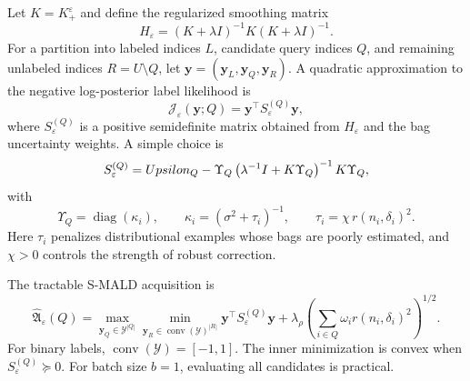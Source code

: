\documentclass[11pt,a4paper]{article}
\DeclareMathOperator{\diag}{diag}
\DeclareMathOperator{\conv}{conv}
\newcommand{\cY}{\mathcal{Y}}
\begin{document}
Let $K=K^\varepsilon_+$ and define the regularized smoothing matrix
\begin{equation}
H_\varepsilon=(K+\lambda I)^{-1}K(K+\lambda I)^{-1}.
\label{eq:H-eps}
\end{equation}
For a partition into labeled indices $L$, candidate query indices $Q$, and remaining unlabeled indices $R=U\setminus Q$, let $\bm y=(\bm y_L,\bm y_Q,\bm y_R)$. A quadratic approximation to the negative log-posterior label likelihood is
\begin{equation}
\mathcal{J}_\varepsilon(\bm y;Q)=\bm y^\top S_\varepsilon^{(Q)}\bm y,
\label{eq:quad-label-objective}
\end{equation}
where $S_\varepsilon^{(Q)}$ is a positive semidefinite matrix obtained from $H_\varepsilon$ and the bag uncertainty weights. A simple choice is
\begin{equation}
S_\varepsilon^{(Q)}=\\Upsilon_Q-
\Upsilon_Q\left(\lambda^{-1}I+K\Upsilon_Q\right)^{-1}K\Upsilon_Q,
\label{eq:S-eps}
\end{equation}
with
\begin{equation}
\Upsilon_Q=\diag(\kappa_i),
\qquad
\kappa_i=\left(\sigma^2+\tau_i\right)^{-1},
\qquad
\tau_i=\chi\,r(n_i,\delta_i)^2.
\label{eq:uncertainty-weight}
\end{equation}
Here $\tau_i$ penalizes distributional examples whose bags are poorly estimated, and $\chi>0$ controls the strength of robust correction.

The tractable S-MALD acquisition is
\begin{equation}
\widehat{\mathfrak{A}}_\varepsilon(Q)
=\max_{\bm y_Q\in\cY^{|Q|}}
\min_{\bm y_R\in\conv(\cY)^{|R|}}
\bm y^\top S_\varepsilon^{(Q)}\bm y
+\lambda_\rho \left(\sum_{i\in Q}\omega_i r(n_i,\delta_i)^2\right)^{1/2}.
\label{eq:tractable-smald}
\end{equation}
For binary labels, $\conv(\cY)=[-1,1]$. The inner minimization is convex when $S_\varepsilon^{(Q)}\succeq 0$. For batch size $b=1$, evaluating all candidates is practical.
\end{document}
